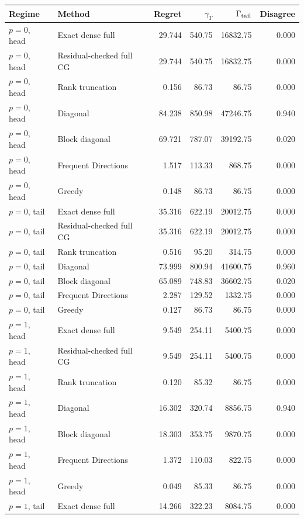 \begin{tabular}{llrrrr}
\toprule
Regime & Method & Regret & $\gamma_T$ & $\Gamma_{\rm tail}$ & Disagree \\
\midrule
$p=0$, head & Exact dense full & 29.744 & 540.75 & 16832.75 & 0.000 \\
$p=0$, head & Residual-checked full CG & 29.744 & 540.75 & 16832.75 & 0.000 \\
$p=0$, head & Rank truncation & 0.156 & 86.73 & 86.75 & 0.000 \\
$p=0$, head & Diagonal & 84.238 & 850.98 & 47246.75 & 0.940 \\
$p=0$, head & Block diagonal & 69.721 & 787.07 & 39192.75 & 0.020 \\
$p=0$, head & Frequent Directions & 1.517 & 113.33 & 868.75 & 0.000 \\
$p=0$, head & Greedy & 0.148 & 86.73 & 86.75 & 0.000 \\
\addlinespace
$p=0$, tail & Exact dense full & 35.316 & 622.19 & 20012.75 & 0.000 \\
$p=0$, tail & Residual-checked full CG & 35.316 & 622.19 & 20012.75 & 0.000 \\
$p=0$, tail & Rank truncation & 0.516 & 95.20 & 314.75 & 0.000 \\
$p=0$, tail & Diagonal & 73.999 & 800.94 & 41600.75 & 0.960 \\
$p=0$, tail & Block diagonal & 65.089 & 748.83 & 36602.75 & 0.020 \\
$p=0$, tail & Frequent Directions & 2.287 & 129.52 & 1332.75 & 0.000 \\
$p=0$, tail & Greedy & 0.127 & 86.73 & 86.75 & 0.000 \\
\addlinespace
$p=1$, head & Exact dense full & 9.549 & 254.11 & 5400.75 & 0.000 \\
$p=1$, head & Residual-checked full CG & 9.549 & 254.11 & 5400.75 & 0.000 \\
$p=1$, head & Rank truncation & 0.120 & 85.32 & 86.75 & 0.000 \\
$p=1$, head & Diagonal & 16.302 & 320.74 & 8856.75 & 0.940 \\
$p=1$, head & Block diagonal & 18.303 & 353.75 & 9870.75 & 0.000 \\
$p=1$, head & Frequent Directions & 1.372 & 110.03 & 822.75 & 0.000 \\
$p=1$, head & Greedy & 0.049 & 85.33 & 86.75 & 0.000 \\
\addlinespace
$p=1$, tail & Exact dense full & 14.266 & 322.23 & 8084.75 & 0.000 \\

\end{tabular}
